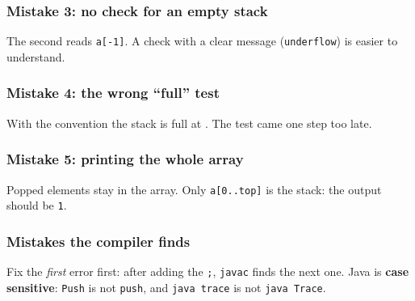 \documentclass[aspectratio=169,10pt,compress]{beamer}
\begin{document}
\begin{frame}[t,fragile] \frametitle{Mistake 3: no check for an empty stack}

  \vspace{0.2em}
  \small The second  reads \texttt{a[-1]}. A check with a clear message (\texttt{underflow}) is easier to understand.
\end{frame}




\begin{frame}[t,fragile] \frametitle{Mistake 4: the wrong ``full'' test}

  \vspace{0.2em}
  \small With the  convention the stack is full at . The test came one step too late.
\end{frame}




\begin{frame}[t,fragile] \frametitle{Mistake 5: printing the whole array}

  \vspace{0.2em}
  \small Popped elements stay in the array. Only \texttt{a[0..top]} is the stack: the output should be \texttt{1}.
\end{frame}




\begin{frame}[t,fragile] \frametitle{Mistakes the compiler finds}

  \vspace{0.1em}
  \small
  Fix the \emph{first} error first: after adding the \texttt{;}, \texttt{javac} finds the next one. Java is \textbf{case sensitive}:
  \texttt{Push} is not \texttt{push}, and \texttt{java trace} is not \texttt{java Trace}.
\end{frame}
\end{document}
